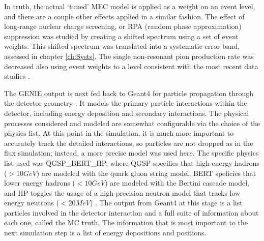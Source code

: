 In truth, the actual `tuned' MEC model is applied as a weight on an event level, and there are a couple other effects applied in a similar fashion. The effect of long-range nuclear charge screening, or RPA (random phase approximation) suppression was studied by creating a shifted spectrum using a set of event weights. This shifted spectrum was translated into a systematic error band, assessed in chapter \ref{ch:Systs}. The single non-resonant pion production rate was decreased also using event weights to a level consistent with the most recent data studies \cite{ref:TNGENIE}.

The GENIE output is next fed back to Geant4 for particle propagation through the detector geometry \cite{ref:Geant41, ref:Geant42}. It models the primary particle interactions within the detector, including energy deposition and secondary interactions. The physical processes considered and modeled are somewhat configurable via the choice of the physics list. At this point in the simulation, it is much more important to accurately track the detailed interactions, so particles are not dropped as in the flux simulation; instead, a more precise model was used here. The specific physics list used was QGSP\_BERT\_HP, where QGSP specifies that high energy hadrons ($> 10\unit{GeV}$) are modeled with the quark gluon string model, BERT speficies that lower energy hadrons ($< 10\unit{GeV}$) are modeled with the Bertini cascade model, and HP toggles the usage of a high precision neutron model that tracks low energy neutrons ($< 20\unit{MeV}$) \cite{ref:TNDetSimFA}. The output from Geant4 at this stage is a list particles involved in the detector interaction and a full suite of information about each one, called the MC truth. The information that is most important to the next simulation step is a list of energy depositions and positions.


